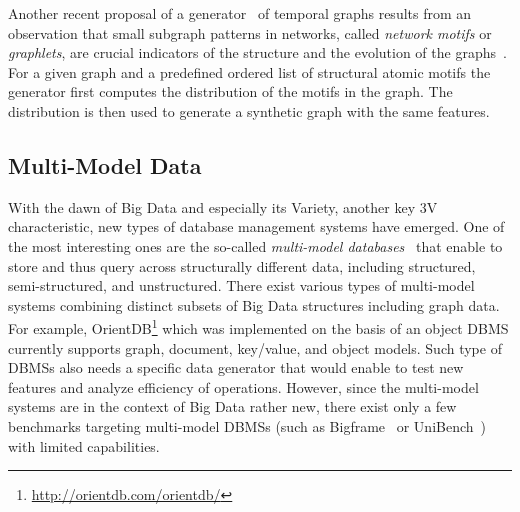 Another recent proposal of a generator~\cite{mlg2018_42} of temporal graphs
results from an observation that small subgraph patterns in networks, called
\emph{network motifs} or \emph{graphlets}, are crucial indicators of the
structure and the evolution of the
graphs~\cite{Paranjape:2017:MTN:3018661.3018731}. For a given graph and a
predefined ordered list of structural atomic motifs the generator first computes
the distribution of the motifs in the graph. The distribution is then used to
generate a synthetic graph with the same features.




\subsection{Multi-Model Data}
With the dawn of Big Data and especially its Variety, another key 3V characteristic, new types of
database management systems have emerged. One of the most interesting ones
are the so-called \emph{multi-model databases}~\cite{Lu:2019:MDN:3341324.3323214} that enable to store and
thus query across structurally different data, including structured, semi-structured, and unstructured. There exist various types of
multi-model systems combining  distinct subsets of Big Data structures including graph data.
For example, OrientDB\footnote{\url{http://orientdb.com/orientdb/}} which was
implemented on the basis of an object DBMS currently supports graph, document,
key/value, and object models. Such type of DBMSs also needs a specific
data generator that would enable
to test new features and analyze efficiency of operations. However, since the
multi-model systems are in the context of Big Data rather new, there exist only
a few benchmarks targeting multi-model DBMSs (such as
Bigframe~\cite{journals/pvldb/KunjirKB14} or UniBench~\cite{conf/cidr/lu17})
with limited capabilities.


